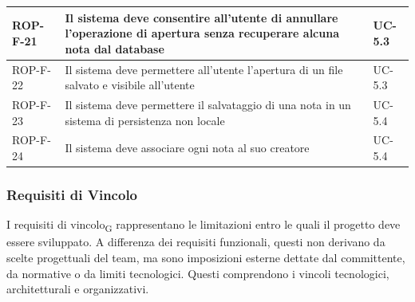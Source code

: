 \documentclass[11pt,a4paper]{article}
\begin{document}
\begin{longtable}{|p{}|>{\raggedright\arraybackslash}p{}|p{}|}
ROP-F-21 & Il sistema deve consentire all'utente di annullare l'operazione di apertura senza recuperare alcuna nota dal database & UC-5.3 \\
\hline
ROP-F-22 & Il sistema deve permettere all'utente l'apertura di un file salvato e visibile all'utente & UC-5.3 \\
\hline
ROP-F-23 & Il sistema deve permettere il salvataggio di una nota in un sistema di persistenza non locale & UC-5.4 \\
\hline
ROP-F-24 & Il sistema deve associare ogni nota al suo creatore & UC-5.4 \\
\hline
\end{longtable}

\subsubsection{Requisiti di Vincolo}
I requisiti di vincolo\textsubscript{G} rappresentano le limitazioni entro le quali il progetto deve essere sviluppato. A differenza dei requisiti funzionali, questi non derivano da scelte progettuali del team, ma sono imposizioni esterne dettate dal committente, da normative o da limiti tecnologici.
Questi comprendono i vincoli tecnologici, architetturali e organizzativi.
\end{document}
